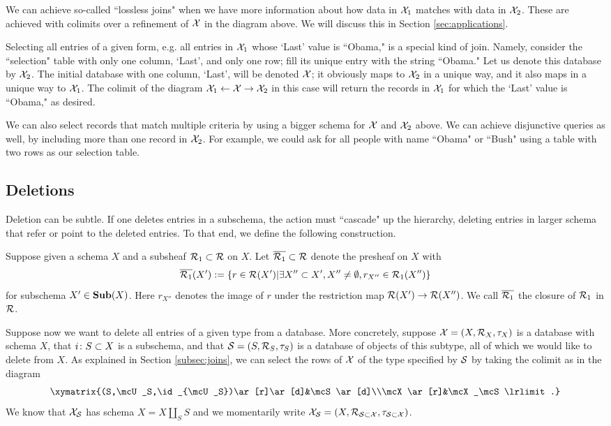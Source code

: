 \documentclass{amsart}
\def\Sub{{\bf Sub}}
\begin{document}
We can achieve so-called ``lossless joins" when we have more information about how data in $\mathcal{X}_1$ matches with data in $\mathcal{X}_2$.  These are achieved with colimits over a refinement of $\mathcal{X}$ in the diagram above.  We will discuss this in Section \ref{sec:applications}.

Selecting all entries of a given form, e.g. all entries in $\mathcal{X}_1$ whose `Last' value is ``Obama," is a special kind of join.  Namely, consider the ``selection" table with only one column, `Last', and only one row; fill its unique entry with the string ``Obama."  Let us denote this database by $\mathcal{X}_2$.  The initial database with one column, `Last', will be denoted $\mathcal{X}$; it obviously maps to $\mathcal{X}_2$ in a unique way, and it also maps in a unique way to $\mathcal{X}_1$.  The colimit of the diagram $\mathcal{X}_1\leftarrow\mathcal{X}\rightarrow\mathcal{X}_2$ in this case will return the records in $\mathcal{X}_1$ for which the `Last' value is ``Obama," as desired.

We can also select records that match multiple criteria by using a bigger schema for $\mathcal{X}$ and $\mathcal{X}_2$ above.  We can achieve disjunctive queries as well, by including more than one record in $\mathcal{X}_2$.  For example, we could ask for all people with name ``Obama" or ``Bush" using a table with two rows as our selection table. 

\subsection{Deletions}

Deletion can be subtle.  If one deletes entries in a subschema, the action must ``cascade" up the hierarchy, deleting entries in larger schema that refer or point to the deleted entries.  To that end, we define the following construction.  

\begin{definition}

Suppose given a schema $X$ and a subsheaf $\mathcal{R}_1\subset\mathcal{R}$ on $X$.  Let $\overline{\mathcal{R}_1}\subset\mathcal{R}$ denote the presheaf on $X$ with $$\overline{\mathcal{R}_1}(X'):=\{r\in\mathcal{R}(X')|\exists X''\subset X', X''\neq\emptyset, r_{X''}\in\mathcal{R}_1(X'')\}$$ for subschema $X'\in\Sub(X)$.  Here $r_{X''}$ denotes the image of $r$ under the restriction map $\mathcal{R}(X')\rightarrow\mathcal{R}(X'')$.  We call $\overline{\mathcal{R}_1}$ the closure of $\mathcal{R}_1$ in $\mathcal{R}$.

\end{definition}

Suppose now we want to delete all entries of a given type from a database.  More concretely, suppose $\mathcal{X}=(X,\mathcal{R}_X,\tau_X)$ is a database with schema $X$, that $i\colon S\subset X$ is a subschema, and that $\mathcal{S}=(S,\mathcal{R}_S,\tau_S)$ is a database of objects of this subtype, all of which we would like to delete from $X$.  As explained in Section \ref{subsec:joins}, we can select the rows of $\mathcal{X}$ of the type specified by $\mathcal{S}$ by taking the colimit as in the diagram $$\xymatrix{(S,\mcU_S,\id_{\mcU_S})\ar[r]\ar[d]&\mcS\ar[d]\\\mcX\ar[r]&\mcX_\mcS\lrlimit.}$$  We know that $\mathcal{X}_\mathcal{S}$ has schema $X=X\amalg_SS$ and we momentarily write $\mathcal{X}_\mathcal{S}=(X,\mathcal{R}_{\mathcal{S}\subset\mathcal{X}},\tau_{\mathcal{S}\subset\mathcal{X}})$.  
\end{document}
